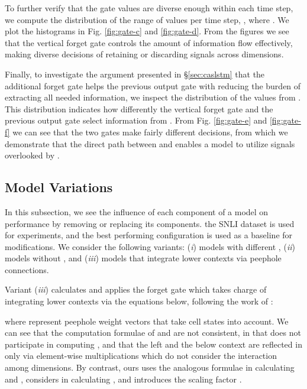\documentclass[wcp]{jmlr}
\begin{document}
    To further verify that the gate values are diverse enough within each time step, we compute the distribution of the range of values per time step, , where .
    We plot the histograms in Fig. \ref{fig:gate-c} and \ref{fig:gate-d}.
    From the figures we see that the vertical forget gate controls the amount of information flow effectively, making diverse decisions of retaining or discarding signals across dimensions.
    
    Finally, to investigate the argument presented in \S\ref{sec:caslstm} that the additional forget gate helps the previous output gate with reducing the burden of extracting all needed information, we inspect the distribution of the values from .
    This distribution indicates how differently the vertical forget gate and the previous output gate select information from .
    From Fig. \ref{fig:gate-e} and \ref{fig:gate-f} we can see that the two gates make fairly different decisions, from which we demonstrate that the direct path between  and  enables a model to utilize signals overlooked by .
    
    \subsection{Model Variations}
    \label{exp:variations}
     
    In this subsection, we see the influence of each component of a model on performance by removing or replacing its components.
    the SNLI dataset is used for experiments, and the best performing configuration is used as a baseline for modifications.
    We consider the following variants: (\textit{i}) models with different , (\textit{ii}) models without , and (\textit{iii}) models that integrate lower contexts via peephole connections.
    
    Variant (\textit{iii}) calculates and applies the forget gate  which takes charge of integrating lower contexts via the equations below, following the work of \citet{zhang2016highway}:
    
    where  represent peephole weight vectors that take cell states into account.
    We can see that the computation formulae of  and  are not consistent, in that  does not participate in computing , and that the left and the below context are reflected in  only via element-wise multiplications which do not consider the interaction among dimensions.
    By contrast, ours uses the analogous formulae in calculating  and , considers  in calculating , and introduces the scaling factor .
    
\end{document}
